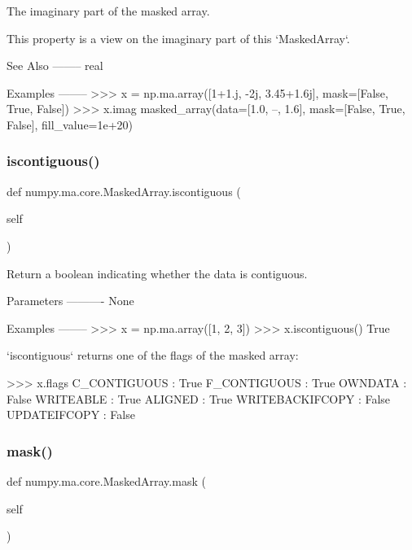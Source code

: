 \begin{DoxyVerb}The imaginary part of the masked array.

This property is a view on the imaginary part of this `MaskedArray`.

See Also
--------
real

Examples
--------
>>> x = np.ma.array([1+1.j, -2j, 3.45+1.6j], mask=[False, True, False])
>>> x.imag
masked_array(data=[1.0, --, 1.6],
     mask=[False,  True, False],
       fill_value=1e+20)\end{DoxyVerb}
 \mbox{\label{classnumpy_1_1ma_1_1core_1_1MaskedArray_aed7e048897a014b22a53de87bf273bb5}} 
\subsubsection{\texorpdfstring{iscontiguous()}{iscontiguous()}}
{\footnotesize\ttfamily def numpy.\+ma.\+core.\+Masked\+Array.\+iscontiguous (\begin{DoxyParamCaption}\item[{}]{self }\end{DoxyParamCaption})}

\begin{DoxyVerb}Return a boolean indicating whether the data is contiguous.

Parameters
----------
None

Examples
--------
>>> x = np.ma.array([1, 2, 3])
>>> x.iscontiguous()
True

`iscontiguous` returns one of the flags of the masked array:

>>> x.flags
  C_CONTIGUOUS : True
  F_CONTIGUOUS : True
  OWNDATA : False
  WRITEABLE : True
  ALIGNED : True
  WRITEBACKIFCOPY : False
  UPDATEIFCOPY : False\end{DoxyVerb}
 \mbox{\label{classnumpy_1_1ma_1_1core_1_1MaskedArray_a7ef4d822649ddda22965ba79c54e0afc}} 
\subsubsection{\texorpdfstring{mask()}{mask()}\hspace{0.1cm}{\footnotesize\ttfamily [1/2]}}
{\footnotesize\ttfamily def numpy.\+ma.\+core.\+Masked\+Array.\+mask (\begin{DoxyParamCaption}\item[{}]{self }\end{DoxyParamCaption})}

